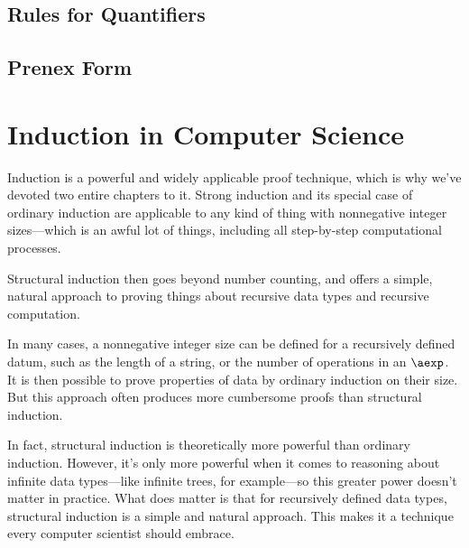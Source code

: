 \begin{definition}
\begin{editingnotes}
\section{Rules for Quantifiers}

\subsection{Prenex Form}
\begin{problems}
\end{problems}
\end{editingnotes}

\section{Induction in Computer Science}

Induction is a powerful and widely applicable proof technique, which
is why we've devoted two entire chapters to it.  Strong induction and
its special case of ordinary induction are applicable to any kind of
thing with nonnegative integer sizes---which is an awful lot of things,
including all step-by-step computational processes.

Structural induction then goes beyond number counting, and offers a
simple, natural approach to proving things about recursive data types
and recursive computation.


In many cases, a nonnegative integer size can be defined for a recursively
defined datum, such as the length of a string, or the number of operations
in an $\aexp$.  It is then possible to prove properties of data by ordinary
induction on their size.  But this approach often produces more cumbersome
proofs than structural induction.

In fact, structural induction is theoretically more powerful than ordinary
induction.  However, it's only more powerful when it comes to reasoning
about infinite data types---like infinite trees, for example---so this
greater power doesn't matter in practice.  What does matter is that for
recursively defined data types, structural induction is a simple and
natural approach.    This makes it a technique every computer
scientist should embrace.


\end{definition}
